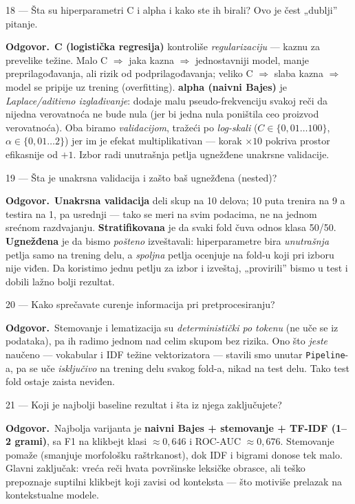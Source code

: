 \documentclass[11pt,a4paper]{article}
\newcommand{\kod}[1]{\texttt{#1}}
\newcommand{\odg}{\smallskip\noindent\textbf{Odgovor.}\ }
\begin{document}
\begin{pitanje}{18 --- Šta su hiperparametri C i alpha i kako ste ih birali?}
Ovo je čest „dublji'' pitanje.
\end{pitanje}
\odg \textbf{C (logistička regresija)} kontroliše \emph{regularizaciju} --- kaznu za
prevelike težine. Malo C $\Rightarrow$ jaka kazna $\Rightarrow$ jednostavniji model,
manje preprilagođavanja, ali rizik od podprilagođavanja; veliko C $\Rightarrow$ slaba
kazna $\Rightarrow$ model se pripije uz trening (overfitting). \textbf{alpha (naivni
Bajes)} je \emph{Laplace/aditivno izglađivanje}: dodaje malu pseudo-frekvenciju svakoj
reči da nijedna verovatnoća ne bude nula (jer bi jedna nula poništila ceo proizvod
verovatnoća). Oba biramo \emph{validacijom}, tražeći po \emph{log-skali}
($C\in\{0{,}01\dots100\}$, $\alpha\in\{0{,}01\dots2\}$) jer im je efekat multiplikativan
--- korak $\times10$ pokriva prostor efikasnije od $+1$. Izbor radi unutrašnja petlja
ugnežđene unakrsne validacije.

\begin{pitanje}{19 --- Šta je unakrsna validacija i zašto baš ugnežđena (nested)?}
\end{pitanje}
\odg \textbf{Unakrsna validacija} deli skup na 10 delova; 10 puta trenira na 9 a testira
na 1, pa usrednji --- tako se meri na svim podacima, ne na jednom srećnom razdvajanju.
\textbf{Stratifikovana} je da svaki fold čuva odnos klasa 50/50. \textbf{Ugnežđena} je
da bismo \emph{pošteno} izveštavali: hiperparametre bira \emph{unutrašnja} petlja samo
na trening delu, a \emph{spoljna} petlja ocenjuje na fold-u koji pri izboru nije viđen.
Da koristimo jednu petlju za izbor i izveštaj, „provirili'' bismo u test i dobili lažno
bolji rezultat.

\begin{pitanje}{20 --- Kako sprečavate curenje informacija pri pretprocesiranju?}
\end{pitanje}
\odg Stemovanje i lematizacija su \emph{deterministički po tokenu} (ne uče se iz
podataka), pa ih radimo jednom nad celim skupom bez rizika. Ono što \emph{jeste}
naučeno --- vokabular i IDF težine vektorizatora --- stavili smo unutar
\kod{Pipeline}-a, pa se uče \emph{isključivo} na trening delu svakog fold-a, nikad na
test delu. Tako test fold ostaje zaista neviđen.

\begin{pitanje}{21 --- Koji je najbolji baseline rezultat i šta iz njega zaključujete?}
\end{pitanje}
\odg Najbolja varijanta je \textbf{naivni Bajes + stemovanje + TF-IDF (1--2 grami)}, sa
F1 na klikbejt klasi $\approx 0{,}646$ i ROC-AUC $\approx 0{,}676$. Stemovanje pomaže
(smanjuje morfološku raštrkanost), dok IDF i bigrami donose tek malo. Glavni zaključak:
vreća reči hvata površinske leksičke obrasce, ali teško prepoznaje suptilni klikbejt
koji zavisi od konteksta --- što motiviše prelazak na kontekstualne modele.
\end{document}
